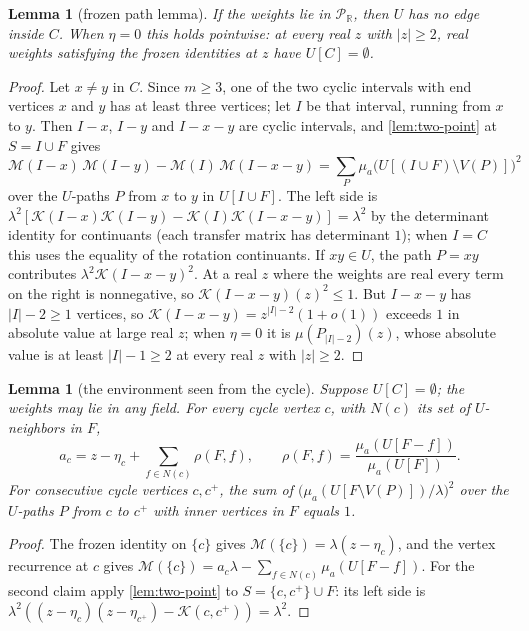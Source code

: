\documentclass[11pt]{amsart}
\theoremstyle{plain}
\newtheorem{lemma}[theorem]{Lemma}
\theoremstyle{definition}
\theoremstyle{remark}
\numberwithin{equation}{section}
\newcommand{\RR}{\mathbb{R}}
\newcommand{\Puis}{\mathcal{P}_{\RR}}
\newcommand{\Mpot}{\mathcal{M}}           %
\newcommand{\cont}{\mathcal{K}}           %
\begin{document}
\begin{lemma}[frozen path lemma]\label{lem:frozen-path}
If the weights lie in $\Puis$, then $U$ has no edge inside $C$. When $\eta=0$ this holds pointwise: at every real $z$ with $|z|\ge2$, real weights satisfying the frozen identities at $z$ have $U[C]=\emptyset$.
\end{lemma}
\begin{proof}
Let $x\neq y$ in $C$. Since $m\ge3$, one of the two cyclic intervals with end vertices $x$ and $y$ has at least three vertices; let $I$ be that interval, running from $x$ to $y$. Then $I-x$, $I-y$ and $I-x-y$ are cyclic intervals, and \cref{lem:two-point} at $S=I\cup F$ gives
\[
\Mpot(I-x)\,\Mpot(I-y)-\Mpot(I)\,\Mpot(I-x-y)=\sum_{P}\mu_a\bigl(U[(I\cup F)\setminus V(P)]\bigr)^{2}
\]
over the $U$-paths $P$ from $x$ to $y$ in $U[I\cup F]$. The left side is $\lambda^{2}[\cont(I-x)\cont(I-y)-\cont(I)\cont(I-x-y)]=\lambda^{2}$ by the determinant identity for continuants (each transfer matrix has determinant $1$); when $I=C$ this uses the equality of the rotation continuants. If $xy\in U$, the path $P=xy$ contributes $\lambda^{2}\cont(I-x-y)^{2}$. At a real $z$ where the weights are real every term on the right is nonnegative, so $\cont(I-x-y)(z)^{2}\le1$. But $I-x-y$ has $|I|-2\ge1$ vertices, so $\cont(I-x-y)=z^{|I|-2}(1+o(1))$ exceeds $1$ in absolute value at large real $z$; when $\eta=0$ it is $\mu(P_{|I|-2})(z)$, whose absolute value is at least $|I|-1\ge2$ at every real $z$ with $|z|\ge2$.
\end{proof}

\begin{lemma}[the environment seen from the cycle]\label{lem:env-seen}
Suppose $U[C]=\emptyset$; the weights may lie in any field. For every cycle vertex $c$, with $N(c)$ its set of $U$-neighbors in $F$,
\[
a_c=z-\eta_c+\sum_{f\in N(c)}\rho(F,f),\qquad \rho(F,f)=\frac{\mu_a(U[F-f])}{\mu_a(U[F])}.
\]
For consecutive cycle vertices $c,c^{+}$, the sum of $\bigl(\mu_a(U[F\setminus V(P)])/\lambda\bigr)^{2}$ over the $U$-paths $P$ from $c$ to $c^{+}$ with inner vertices in $F$ equals $1$.
\end{lemma}
\begin{proof}
The frozen identity on $\{c\}$ gives $\Mpot(\{c\})=\lambda(z-\eta_c)$, and the vertex recurrence at $c$ gives $\Mpot(\{c\})=a_c\lambda-\sum_{f\in N(c)}\mu_a(U[F-f])$. For the second claim apply \cref{lem:two-point} to $S=\{c,c^{+}\}\cup F$: its left side is $\lambda^{2}((z-\eta_c)(z-\eta_{c^+})-\cont(c,c^{+}))=\lambda^{2}$.
\end{proof}
\end{document}
